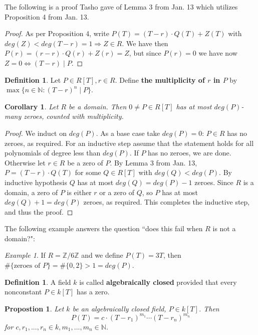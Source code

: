 \documentclass{amsart}
\newcommand{\NN}{\mathbb{N}}
\newcommand{\ZZ}{\mathbb{Z}}
\newtheorem{prop}[thm]{Propostion}
\newtheorem{cor}{Corollary}
\theoremstyle{definition}
\newtheorem{defn}[thm]{Definition}
\theoremstyle{remark}
\newtheorem*{ex}{Example}
\begin{document}
The following is a proof Tasho gave of Lemma 3 from Jan. 13 which utilizes Proposition 4 from Jan. 13.
\begin{proof}
As per Proposition 4, write $P(T) = (T - r) \cdot Q(T) + Z(T)$ with $deg(Z) < deg(T - r) = 1 \Rightarrow Z \in R$. We have then $P(r) = (r - r) \cdot Q(r) + Z(r) = Z$, but since $P(r) = 0$ we have now $Z = 0 \Leftrightarrow (T - r) \mid P$.
\end{proof}

\begin{defn}
Let $P \in R[T], r \in R$. Define \textbf{the multiplicity of $r$ in $P$} by $\max\{n \in \NN \colon (T - r)^n \mid P\}$.
\end{defn}

\begin{cor}
Let $R$ be a domain. Then $0 \neq P \in R[T]$ has at most $deg(P)$-many zeroes, counted with multiplicity.
\end{cor}
\begin{proof}
We induct on $deg(P)$. As a base case take $deg(P) = 0$: $P \in R$ has no zeroes, as required. For an inductive step assume that the statement holds for all polynomials of degree less than $deg(P)$. If $P$ has no zeroes, we are done. Otherwise let $r \in R$ be a zero of $P$. By Lemma 3 from Jan. 13, $P = (T - r) \cdot Q(T)$ for some $Q \in R[T]$ with $deg(Q) < deg(P)$. By inductive hypothesis $Q$ has at most $deg(Q) = deg(P) - 1$ zeroes. Since $R$ is a domain, a zero of $P$ is either $r$ or a zero of $Q$, so $P$ has at most $deg(Q) + 1 = deg(P)$ zeroes, as required. This completes the inductive step, and thus the proof.
\end{proof}
The following example answers the question ``does this fail when $R$ is not a domain?":
\begin{ex}
If $R = \ZZ / 6\ZZ$ and we define $P(T) = 3T$, then $\#\{ \text{zeroes of } P \} = \#\{0, 2\} > 1 = deg(P)$.
\end{ex}

\begin{defn}
A field $k$ is called \textbf{algebraically closed} provided that every nonconstant $P \in k[T]$ has a zero.
\end{defn}

\begin{prop}
Let $k$ be an algebraically closed field, $P \in k[T]$. Then
\[P(T) = c \cdot (T - r_1)^{m_1} \cdots (T - r_n)^{m_n}\]
for $c, r_1, ..., r_n \in k, m_1, ..., m_n \in \NN$.
\end{prop}
\end{document}
